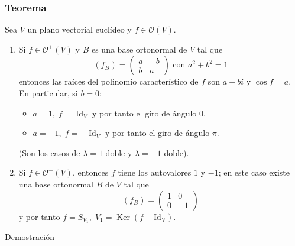 \documentclass[12pt, a4paper, ones, notitlepage, openany,titlepage]{article}
\begin{document}
\subsubsection{Teorema}
Sea $V$ un plano vectorial euclídeo y $f \in \mathcal{O}(V)$. 
\begin{enumerate}[label=(\arabic*)]
	\item Si $f \in \mathcal{O}^+(V)$ y $B$ es una base ortonormal de $V$ tal que
	$$
	(f_B) =
	\begin{pmatrix}
		a & -b \\
		b & a
	\end{pmatrix}
	\text{ con } a^2 + b^2 = 1
	$$
	entonces las raíces del polinomio característico de $f$ son $a \pm bi$ y $\operatorname{cos}f = a$. En particular, si $b = 0$:
	\begin{itemize}
		\item $a = 1, \; f = \operatorname{Id}_V$ y por tanto el giro de ángulo $0$.
		\item $a = -1, \; f = -\operatorname{Id}_V$ y por tanto el giro de ángulo $\pi$.
	\end{itemize}
	(Son los casos de $\lambda = 1$ doble y $\lambda = -1$ doble).
	
	\item Si $f \in \mathcal{O}^-(V)$, entonces $f$ tiene los autovalores $1$ y $-1$; en este caso existe una base ortonormal $B$ de $V$ tal que
	$$
	(f_B) = \begin{pmatrix}
		1 & 0 \\
		0 & -1
	\end{pmatrix}
	$$
	y por tanto $f = S_{V_1}, \; V_1 = \operatorname{Ker}(f - \operatorname{Id_V})$.
\end{enumerate}
\noindent\underline{Demostración}
\end{document}
